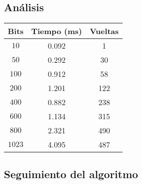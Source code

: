 \documentclass[11pt, conference]{IEEEtran}
\begin{document}
\subsection{Análisis}
\begin{center}
	\begin{tabular}{|c|c|c|}
		\hline
		\textbf{Bits}& {\bf Tiempo} (ms) & {\bf Vueltas} \\	\hline
		$10$ & 0.092 & 1\\ \hline
		$50$ & 0.292 & 30 \\ \hline
		$100$ & 0.912 & 58 \\ \hline
		$200$ & 1.201 & 122 \\ \hline
		$400$ & 0.882 & 238 \\ \hline
		$600$ & 1.134 & 315 \\ \hline
		$800$ & 2.321 & 490 \\ \hline
		$1023$ & 4.095 & 487 \\ \hline
	\end{tabular}
\end{center}
\subsection{Seguimiento del algoritmo}
\end{document}
